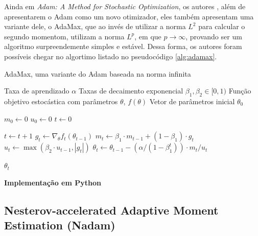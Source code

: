 Ainda em \textit{Adam: A Method for Stochastic Optimization}, os autores \textcite{AdamMethod}, além de apresentarem o Adam como um novo otimizador, eles também apresentam uma variante dele, o AdaMax, que ao invés de utilizar a norma $L^2$ para calcular o segundo momentom, utilizam a norma $L^p$, em que $p \to \infty$, provando ser um algoritmo surpreendemente simples e estável. Dessa forma, os autores foram possíveis chegar no algortimo listado no pseudocódigo \ref{alg:adamax}.

\begin{algorithm}[H] %
    \caption{AdaMax, uma variante do Adam baseada na norma infinita}
    \label{alg:adamax}
    \begin{algorithmic}[1] %

    \Require Taxa de aprendizado $\alpha$
    \Require Taxas de decaimento exponencial $\beta_1, \beta_2 \in [0, 1)$
    \Require Função objetivo estocástica com parâmetros $\theta$, $f(\theta)$
    \Require Vetor de parâmetros inicial $\theta_0$

    \State $m_0 \leftarrow 0$ 
    \State $u_0 \leftarrow 0$ 
    \State $t \leftarrow 0$ 

        \State $t \leftarrow t + 1$
        \State $g_t \leftarrow \nabla_\theta f_t(\theta_{t-1})$ 
        \State $m_t \leftarrow \beta_1 \cdot m_{t-1} + (1 - \beta_1) \cdot g_t$ 
        \State $u_t \leftarrow \max(\beta_2 \cdot u_{t-1}, |g_t|)$ 
        \State $\theta_t \leftarrow \theta_{t-1} - (\alpha / (1 - \beta_1^t)) \cdot m_t / u_t$ 
    \EndWhile

    \State \Return $\theta_t$ 
    \end{algorithmic}
\end{algorithm}

\textbf{Implementação em Python}

\subsection{Nesterov-accelerated Adaptive Moment Estimation (Nadam)}

